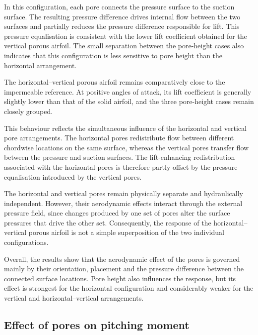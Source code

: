 \documentclass[a4paper,fleqn]{cas-dc}
\begin{document}
	In this configuration, each pore connects the  pressure
	surface to the suction surface. The resulting pressure
	difference drives internal flow between the two surfaces and partially
	reduces the pressure difference responsible for lift. This pressure
	equalisation is consistent with the lower lift coefficient obtained for
	the vertical porous airfoil. The small separation between the
	pore-height cases also indicates that this configuration is less
	sensitive to pore height than the horizontal arrangement.
	
	The horizontal--vertical porous airfoil remains comparatively close to
	the impermeable reference. At positive angles of attack, its lift
	coefficient is generally slightly lower than that of the solid airfoil,
	and the three pore-height cases remain closely grouped.
	
	This behaviour reflects the simultaneous influence of the horizontal
	and vertical pore arrangements. The horizontal pores redistribute flow
	between different chordwise locations on the same surface, whereas the
	vertical pores transfer flow between the pressure and suction surfaces.
	The lift-enhancing redistribution associated with the horizontal pores
	is therefore partly offset by the pressure equalisation introduced by
	the vertical pores.
	
	The horizontal and vertical pores remain physically separate and
	hydraulically independent. However, their aerodynamic effects interact
	through the external pressure field, since changes produced by one set
	of pores alter the surface pressures that drive the other set.
	Consequently, the response of the horizontal--vertical porous airfoil is
	not a simple superposition of the two individual configurations.
	
	Overall, the results show that the aerodynamic effect of the pores is
	governed mainly by their orientation, placement and the pressure
	difference between the connected surface locations. Pore height also
	influences the response, but its effect is strongest for the horizontal
	configuration and considerably weaker for the vertical and
	horizontal--vertical arrangements.
	
	\subsection{Effect of pores on pitching moment}
	\label{subsec:moment_results}
	
\end{document}
